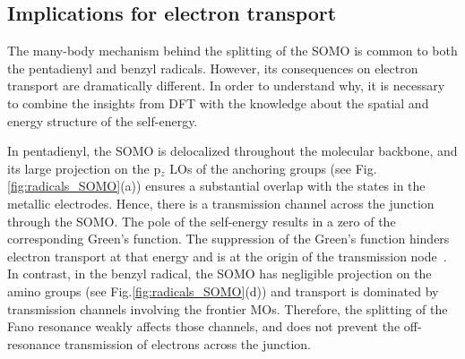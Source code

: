\documentclass[aps,prx,twocolumn,superscriptaddress]{revtex4-2}
\begin{document}
\subsection{Implications for electron transport}
The many-body mechanism behind the splitting of the SOMO is common to both the pentadienyl and benzyl radicals.  
However, its consequences on electron transport are dramatically different. 
In order to understand why, it is necessary to combine the insights from DFT 
with the knowledge about the spatial and energy structure of the self-energy. 

In pentadienyl, the SOMO is delocalized throughout the molecular backbone, 
and its large projection on the p$_z$ LOs of the anchoring groups (see Fig.\ref{fig:radicals_SOMO}(a))
ensures a substantial overlap with the states in the metallic electrodes. 
Hence, there is a transmission channel across the junction through the SOMO. 
The pole of the self-energy results in a zero of the corresponding Green's function.
The suppression of the Green's function hinders electron transport at that energy 
and is at the origin of the transmission node~\cite{valliNL18,valliPRB100}. 
In contrast, in the benzyl radical, the SOMO 
has negligible projection on the amino groups (see Fig.\ref{fig:radicals_SOMO}(d))
and transport is dominated by transmission channels involving the frontier MOs. 
Therefore, the splitting of the Fano resonance weakly affects those channels,  
and does not prevent the off-resonance transmission of electrons across the junction.  
\end{document}
